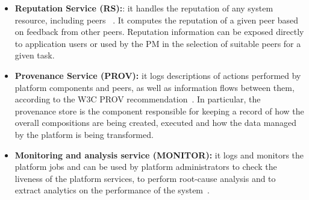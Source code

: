 \begin{itemize}
\item \textbf{Reputation Service (RS):}: it handles the reputation of any system resource, including peers ~\cite{D2.3}. It computes the reputation of a given peer based on feedback from other peers. %
Reputation information can be exposed directly to application users or used by the PM in the selection of suitable peers for a given task. %


\item \textbf{Provenance Service (PROV):} it logs descriptions of actions performed by platform
components and peers, as well as information flows between them, according to the W3C PROV recommendation~\cite{D2.2}. In particular, the provenance store is the component responsible for keeping a record of how the overall compositions are being created, executed and how the data managed by the platform is being transformed. %

\item {\bf Monitoring and analysis service (MONITOR):} it logs and monitors the platform jobs and can be used by platform administrators to check the liveness of the platform services, to perform root-cause analysis and to extract analytics on the performance of the system~\cite{D8.3}. 


\end{itemize}
